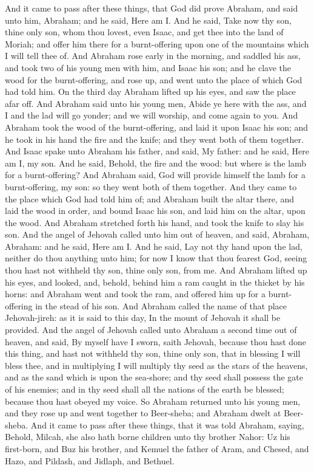 And it came to pass after these things, that God did prove Abraham, and said unto him, Abraham; and he said, Here am I. And he said, Take now thy son, thine only son, whom thou lovest, even Isaac, and get thee into the land of Moriah; and offer him there for a burnt-offering upon one of the mountains which I will tell thee of. And Abraham rose early in the morning, and saddled his ass, and took two of his young men with him, and Isaac his son; and he clave the wood for the burnt-offering, and rose up, and went unto the place of which God had told him. On the third day Abraham lifted up his eyes, and saw the place afar off. And Abraham said unto his young men, Abide ye here with the ass, and I and the lad will go yonder; and we will worship, and come again to you. And Abraham took the wood of the burnt-offering, and laid it upon Isaac his son; and he took in his hand the fire and the knife; and they went both of them together. And Isaac spake unto Abraham his father, and said, My father: and he said, Here am I, my son. And he said, Behold, the fire and the wood: but where is the lamb for a burnt-offering? And Abraham said, God will provide himself the lamb for a burnt-offering, my son: so they went both of them together.  And they came to the place which God had told him of; and Abraham built the altar there, and laid the wood in order, and bound Isaac his son, and laid him on the altar, upon the wood. And Abraham stretched forth his hand, and took the knife to slay his son. And the angel of Jehovah called unto him out of heaven, and said, Abraham, Abraham: and he said, Here am I. And he said, Lay not thy hand upon the lad, neither do thou anything unto him; for now I know that thou fearest God, seeing thou hast not withheld thy son, thine only son, from me. And Abraham lifted up his eyes, and looked, and, behold, behind him a ram caught in the thicket by his horns: and Abraham went and took the ram, and offered him up for a burnt-offering in the stead of his son. And Abraham called the name of that place Jehovah-jireh: as it is said to this day, In the mount of Jehovah it shall be provided. And the angel of Jehovah called unto Abraham a second time out of heaven, and said, By myself have I sworn, saith Jehovah, because thou hast done this thing, and hast not withheld thy son, thine only son, that in blessing I will bless thee, and in multiplying I will multiply thy seed as the stars of the heavens, and as the sand which is upon the sea-shore; and thy seed shall possess the gate of his enemies; and in thy seed shall all the nations of the earth be blessed; because thou hast obeyed my voice. So Abraham returned unto his young men, and they rose up and went together to Beer-sheba; and Abraham dwelt at Beer-sheba.  And it came to pass after these things, that it was told Abraham, saying, Behold, Milcah, she also hath borne children unto thy brother Nahor: Uz his first-born, and Buz his brother, and Kemuel the father of Aram, and Chesed, and Hazo, and Pildash, and Jidlaph, and Bethuel. 
